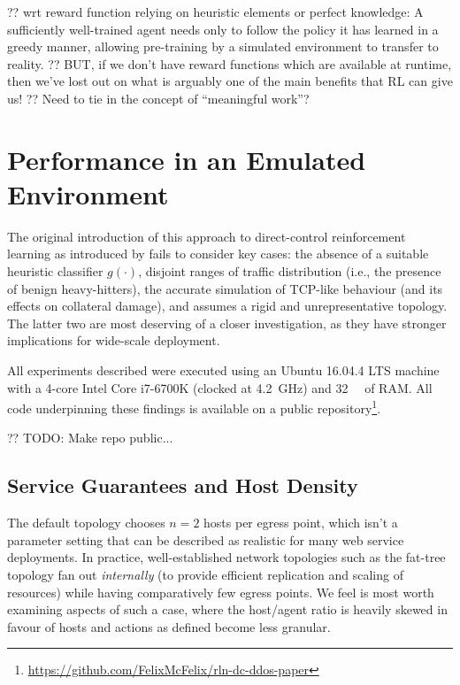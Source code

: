 \documentclass[conference, letterpaper, 10pt, times]{IEEEtran}
\begin{document}
?? wrt reward function relying on heuristic elements or perfect knowledge:
A sufficiently well-trained agent needs only to follow the policy it has learned in a greedy manner, allowing pre-training by a simulated environment to transfer to reality.
?? BUT, if we don't have reward functions which are available at runtime, then we've lost out on what is arguably one of the main benefits that RL can give us!
?? Need to tie in the concept of ``meaningful work''?

\section{Performance in an Emulated Environment}\label{sec:performance-in-an-emulated-environment}
The original introduction of this approach to direct-control reinforcement learning as introduced by \textcite{DBLP:journals/eaai/MalialisK15} fails to consider key cases: the absence of a suitable heuristic classifier $g(\cdot)$, disjoint ranges of traffic distribution (i.e., the presence of benign heavy-hitters), the accurate simulation of TCP-like behaviour (and its effects on collateral damage), and assumes a rigid and unrepresentative topology.
The latter two are most deserving of a closer investigation, as they have stronger implications for wide-scale deployment.

All experiments described were executed using an Ubuntu 16.04.4 LTS machine with a 4-core Intel Core i7-6700K (clocked at \SI{4.2}{\giga\hertz}) and \SI{32}{\gibi\byte} of RAM.
All code underpinning these findings is available on a public repository\footnote{\url{https://github.com/FelixMcFelix/rln-dc-ddos-paper}}.

?? TODO: Make repo public...

\subsection{Service Guarantees and Host Density}
The default topology chooses $n=2$ hosts per egress point, which isn't a parameter setting that can be described as realistic for many web service deployments.
In practice, well-established network topologies such as the fat-tree topology fan out \emph{internally} (to provide efficient replication and scaling of resources) while having comparatively few egress points.
We feel is most worth examining aspects of such a case, where the host/agent ratio is heavily skewed in favour of hosts and actions as defined become less granular.
\end{document}
